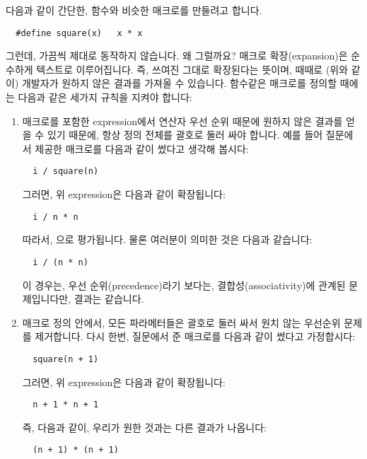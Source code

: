 \begin{faq}
	\label{tttt}
	다음과 같이 간단한, 함수와 비슷한 매크로를 만들려고 합니다.
\begin{verbatim}
  #define square(x)   x * x
\end{verbatim}
	\noindent 그런데, 가끔씩 제대로 동작하지 않습니다. 왜 그럴까요?
\A
	매크로 확장(expansion)은 순수하게 텍스트로 이루어집니다.
        즉, 쓰여진 그대로 확장된다는 뜻이며, 때때로 (위와 같이) 개발자가
        원하지 않은 결과를 가져올 수 있습니다. 함수같은 매크로를 정의할 때에는
        다음과 같은 세가지 규칙을 지켜야 합니다:
\begin{enumerate}
  	\item 매크로를 포함한 expression에서 연산자 우선 순위 때문에 원하지
          않은 결과를 얻을 수 있기 때문에, 항상 정의 전체를 괄호로 둘러 싸야
          합니다. 예를 들어
          질문에서 제공한  매크로를 다음과 같이 썼다고 생각해
          봅시다:
\begin{verbatim}
  i / square(n)
\end{verbatim}
          \noindent 그러면, 위 expression은 다음과 같이 확장됩니다:
\begin{verbatim}
  i / n * n
\end{verbatim}
	  \noindent 따라서, 으로 평가됩니다. 물론 여러분이
          의미한 것은 다음과 같습니다:
\begin{verbatim}
  i / (n * n)
\end{verbatim}
	이 경우는, 우선 순위(precedence)라기 보다는, 결합성(associativity)에
        관계된 문제입니다만, 결과는 같습니다.

	\item 매크로 정의 안에서, 모든 파라메터들은 괄호로 둘러 싸서 원치 않는
          우선순위 문제를 제거합니다. 다시 한번, 질문에서 준 매크로를 다음과
          같이 썼다고 가정합시다:
\begin{verbatim}
  square(n + 1)
\end{verbatim}
	그러면, 위 expression은 다음과 같이 확장됩니다:
\begin{verbatim}
  n + 1 * n + 1
\end{verbatim}
	즉, 다음과 같이, 우리가 원한 것과는 다른 결과가 나옵니다:
\begin{verbatim}
  (n + 1) * (n + 1)
\end{verbatim}
	

\end{enumerate}
\end{faq}
